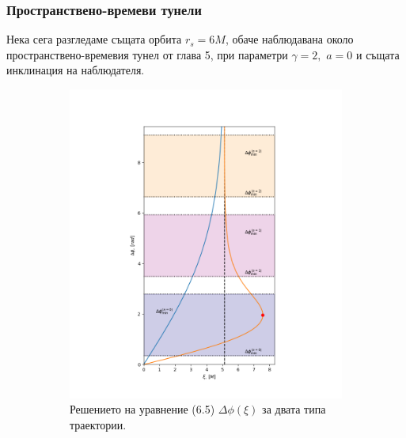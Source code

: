 \subsubsection{Пространствено-времеви тунели}
Нека сега разгледаме същата орбита $r_s = 6M$, обаче наблюдавана около пространствено-времевия тунел от глава 5, при параметри $\gamma = 2,\,\, a = 0$ и същата инклинация на наблюдателя.
\begin{figure}[h]
	\centering
	\begin{subfigure}{6cm}
		\centering
		\includegraphics[scale = 0.3]{WH_70_deg_r6_impact_gamma_2.png}
		\caption{Решението на уравнение (6.5) $\Delta\phi(\xi)$ за двата типа траектории.} \label{fig:1a}
	\end{subfigure}\,\,\,
	\begin{subfigure}{6cm}
		\centering

\end{subfigure}
\end{figure}
